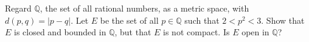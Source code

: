 \setcounter{exercise}{15}
\begin{exercise}
	Regard $\mathbb{Q}$, the set of all rational numbers, as a metric space, with $d(p,q) = |p - q|$. Let $E$ be the set of all $p \in \mathbb{Q}$ such that $2 < p^2 < 3$. Show that $E$ is closed and bounded in $\mathbb{Q}$, but that $E$ is not compact. Is $E$ open in $\mathbb{Q}$?
\end{exercise}
